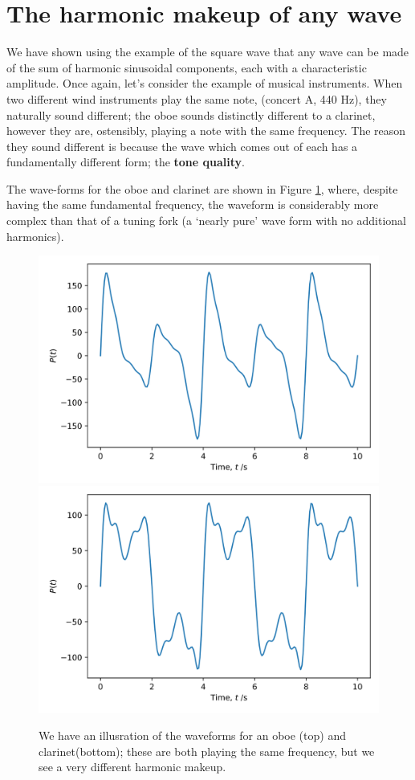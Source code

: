 \documentclass[
]{book}
\begin{document}
\hypertarget{sec-ch11-harmonicwavemakeup1}{%
\section{The harmonic makeup of any wave}\label{sec-ch11-harmonicwavemakeup1}}

We have shown using the example of the square wave that any wave can be made of the sum of harmonic sinusoidal components, each with a characteristic amplitude. Once again, let's consider the example of musical instruments. When two different wind instruments play the same note, (concert A, 440 Hz), they naturally sound different; the oboe sounds distinctly different to a clarinet, however they are, ostensibly, playing a note with the same frequency. The reason they sound different is because the wave which comes out of each has a fundamentally different form; the \textbf{tone quality}.

The wave-forms for the oboe and clarinet are shown in Figure \ref{fig:ch11-oboeclarinetwaveform1}, where, despite having the same fundamental frequency, the waveform is considerably more complex than that of a tuning fork (a `nearly pure' wave form with no additional harmonics).

\begin{figure}

{\centering \includegraphics[width=0.7\linewidth]{visualisations/slides-harmonicsum_oboe} \includegraphics[width=0.7\linewidth]{visualisations/slides-harmonicsum_clar} 

}

\caption{We have an illusration of the waveforms for an oboe (top) and clarinet(bottom); these are both playing the same frequency, but we see a very different harmonic makeup.}\label{fig:ch11-oboeclarinetwaveform1}
\end{figure}
\end{document}
